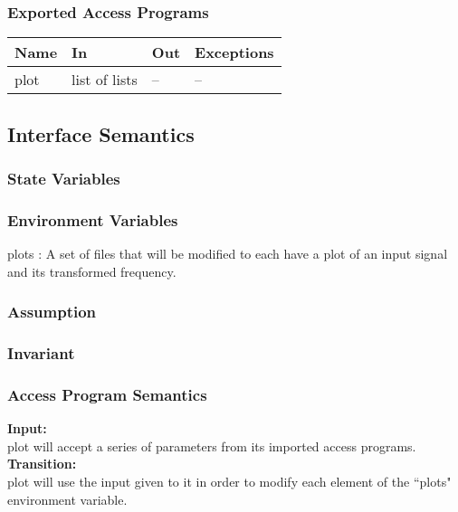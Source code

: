 \documentclass[12pt]{article}
\begin{document}
\subsubsection{Exported Access Programs}
\begin{center}
\begin{tabular}{l l l l}
\hline
\textbf{Name} & \textbf{In} & \textbf{Out} & \textbf{Exceptions} \\ \hline
plot & list of lists & -- & --\\
\hline
\end{tabular}
\end{center}
\subsection{Interface Semantics}
\subsubsection{State Variables}
  
\subsubsection{Environment Variables}
plots : A set of files that will be modified to each have a plot of an
input signal and its transformed frequency. 
\subsubsection{Assumption}
\subsubsection{Invariant}
\subsubsection{Access Program Semantics}
\textbf{Input:}\\
plot will accept a series of parameters from its imported access
programs.\\
\textbf{Transition:}\\
plot will use the input given to it in order to modify each element of
the ``plots" environment variable.

\end{document}
